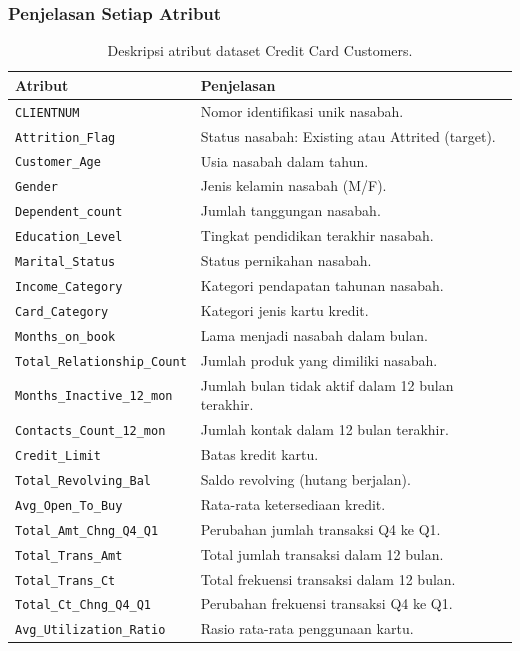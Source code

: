 \documentclass[a4paper,oneside,12pt]{report}
\begin{document}
\subsubsection{Penjelasan Setiap Atribut}
\begin{table}[H]
\centering
\small
\begin{tabular}{|l|p{8cm}|}
\hline
\textbf{Atribut} & \textbf{Penjelasan} \\
\hline
\texttt{CLIENTNUM} & Nomor identifikasi unik nasabah. \\
\texttt{Attrition\_Flag} & Status nasabah: Existing atau Attrited (target). \\
\texttt{Customer\_Age} & Usia nasabah dalam tahun. \\
\texttt{Gender} & Jenis kelamin nasabah (M/F). \\
\texttt{Dependent\_count} & Jumlah tanggungan nasabah. \\
\texttt{Education\_Level} & Tingkat pendidikan terakhir nasabah. \\
\texttt{Marital\_Status} & Status pernikahan nasabah. \\
\texttt{Income\_Category} & Kategori pendapatan tahunan nasabah. \\
\texttt{Card\_Category} & Kategori jenis kartu kredit. \\
\texttt{Months\_on\_book} & Lama menjadi nasabah dalam bulan. \\
\texttt{Total\_Relationship\_Count} & Jumlah produk yang dimiliki nasabah. \\
\texttt{Months\_Inactive\_12\_mon} & Jumlah bulan tidak aktif dalam 12 bulan terakhir. \\
\texttt{Contacts\_Count\_12\_mon} & Jumlah kontak dalam 12 bulan terakhir. \\
\texttt{Credit\_Limit} & Batas kredit kartu. \\
\texttt{Total\_Revolving\_Bal} & Saldo revolving (hutang berjalan). \\
\texttt{Avg\_Open\_To\_Buy} & Rata-rata ketersediaan kredit. \\
\texttt{Total\_Amt\_Chng\_Q4\_Q1} & Perubahan jumlah transaksi Q4 ke Q1. \\
\texttt{Total\_Trans\_Amt} & Total jumlah transaksi dalam 12 bulan. \\
\texttt{Total\_Trans\_Ct} & Total frekuensi transaksi dalam 12 bulan. \\
\texttt{Total\_Ct\_Chng\_Q4\_Q1} & Perubahan frekuensi transaksi Q4 ke Q1. \\
\texttt{Avg\_Utilization\_Ratio} & Rasio rata-rata penggunaan kartu. \\
\hline
\end{tabular}
\caption{Deskripsi atribut dataset Credit Card Customers.}
\label{tab:credit-card-attributes}
\end{table}
\end{document}
